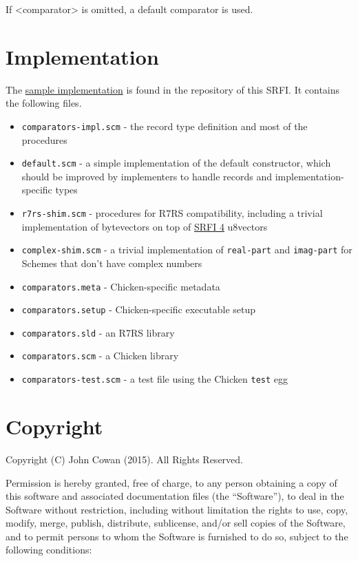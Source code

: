 If \textless{}comparator\textgreater{} is omitted, a default comparator
is used.

\section{Implementation}\label{implementation}

The \href{comparators.tar.gz}{sample implementation} is found in the
repository of this SRFI. It contains the following files.

\begin{itemize}
\tightlist
\item
  \texttt{comparators-impl.scm} - the record type definition and most of
  the procedures
\item
  \texttt{default.scm} - a simple implementation of the default
  constructor, which should be improved by implementers to handle
  records and implementation-specific types
\item
  \texttt{r7rs-shim.scm} - procedures for R7RS compatibility, including
  a trivial implementation of bytevectors on top of
  \href{http://srfi.schemers.org/srfi-4/srfi-4.html}{SRFI 4} u8vectors
\item
  \texttt{complex-shim.scm} - a trivial implementation of
  \texttt{real-part} and \texttt{imag-part} for Schemes that don't have
  complex numbers
\item
  \texttt{comparators.meta} - Chicken-specific metadata
\item
  \texttt{comparators.setup} - Chicken-specific executable setup
\item
  \texttt{comparators.sld} - an R7RS library
\item
  \texttt{comparators.scm} - a Chicken library
\item
  \texttt{comparators-test.scm} - a test file using the Chicken
  \texttt{test} egg
\end{itemize}

\section{Copyright}\label{copyright}

Copyright (C) John Cowan (2015). All Rights Reserved.

Permission is hereby granted, free of charge, to any person obtaining a
copy of this software and associated documentation files (the
``Software''), to deal in the Software without restriction, including
without limitation the rights to use, copy, modify, merge, publish,
distribute, sublicense, and/or sell copies of the Software, and to
permit persons to whom the Software is furnished to do so, subject to
the following conditions:

